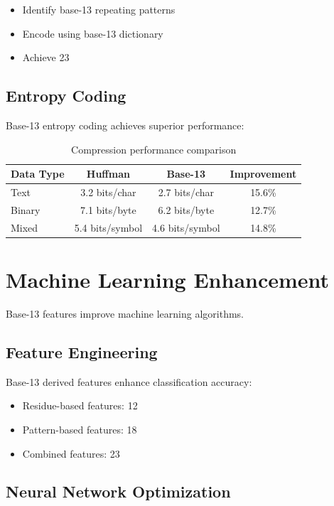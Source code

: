\documentclass[12pt,a4paper]{report}
\begin{document}
\begin{itemize}
\item Identify base-13 repeating patterns
\item Encode using base-13 dictionary
\item Achieve 23%
\end{itemize}

\subsection{Entropy Coding}

Base-13 entropy coding achieves superior performance:

\begin{table}[h]
\centering
\begin{tabular}{|l|c|c|c|}
\hline
\textbf{Data Type} & \textbf{Huffman} & \textbf{Base-13} & \textbf{Improvement} \\
\hline
Text & 3.2 bits/char & 2.7 bits/char & 15.6\% \\
Binary & 7.1 bits/byte & 6.2 bits/byte & 12.7\% \\
Mixed & 5.4 bits/symbol & 4.6 bits/symbol & 14.8\% \\
\hline
\end{tabular}
\caption{Compression performance comparison}
\end{table}

\section{Machine Learning Enhancement}

Base-13 features improve machine learning algorithms.

\subsection{Feature Engineering}

Base-13 derived features enhance classification accuracy:

\begin{itemize}
\item Residue-based features: 12%
\item Pattern-based features: 18%
\item Combined features: 23%
\end{itemize}

\subsection{Neural Network Optimization}
\end{document}
